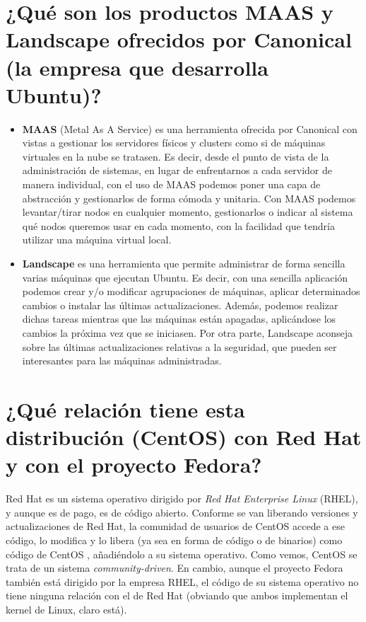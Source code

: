 \section{¿Qué son los productos MAAS y Landscape ofrecidos por Canonical (la empresa que desarrolla Ubuntu)?}
\begin{itemize}
	\item \textbf{MAAS} (Metal As A Service) es una herramienta ofrecida por Canonical con vistas a gestionar los servidores físicos y clusters como si de
	máquinas virtuales en la nube se tratasen. Es decir, desde el punto de vista de la administración de sistemas, en lugar de enfrentarnos
	a cada servidor de manera individual, con el uso de MAAS podemos poner una capa de abstracción y gestionarlos de forma cómoda y unitaria.
	Con MAAS podemos levantar/tirar nodos en cualquier momento, gestionarlos o indicar al sistema qué nodos queremos usar en cada momento, con la
	facilidad que tendría utilizar una máquina virtual local. \cite{maas-doc}
	\item \textbf{Landscape} es una herramienta que permite administrar de forma sencilla varias máquinas que ejecutan Ubuntu. Es decir, con una sencilla
	aplicación podemos crear y/o modificar agrupaciones de máquinas, aplicar determinados cambios o instalar las últimas actualizaciones.
	Además, podemos realizar dichas tareas mientras que las máquinas están apagadas, aplicándose los cambios la próxima vez que se iniciasen.
	Por otra parte, Landscape aconseja sobre las últimas actualizaciones relativas a la seguridad, que pueden ser interesantes para las máquinas
	administradas. \cite{landscape-doc}
\end{itemize}

\section{¿Qué relación tiene esta distribución (CentOS) con Red Hat y con el proyecto Fedora?}

Red Hat es un sistema operativo dirigido por \emph{Red Hat Enterprise Linux} (RHEL), y aunque es de pago, es de código abierto. Conforme se van liberando
versiones y actualizaciones de Red Hat, la comunidad de usuarios de CentOS accede a ese código, lo modifica y lo libera (ya sea en forma de código o de
binarios) como código de CentOS \cite{centos}, añadiéndolo a su sistema operativo. Como vemos, CentOS se trata de un sistema \emph{community-driven}. 
En cambio, aunque el proyecto Fedora \cite{redhat} también está dirigido por la empresa RHEL, el código de su sistema operativo no tiene ninguna relación
con el de Red Hat (obviando que ambos implementan el kernel de Linux, claro está).


